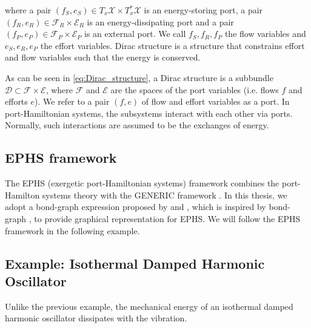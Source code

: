 \documentclass[
	parskip, 			   %
	twoside, 			   %
	DIV=14, 			   %
	BCOR=15.0mm, 		   %
	headsepline, 		   %
	open=right, 		   %
	captions=tableheading, %
	bibliography=totoc,    %
	numbers=noenddot       %
]{scrreprt}
\begin{document}
where a pair $(f_S, e_S) \in T_{x}\mathcal{X} \times T_{x}^{*}\mathcal{X}$ is an energy-storing port, a pair $(f_R, e_R) \in \mathcal{F}_R \times \mathcal{E}_R$ is an energy-dissipating port and a pair $(f_P, e_P) \in \mathcal{F}_P \times \mathcal{E}_P$ is an external port. We call $f_S, f_R, f_P$ the flow variables and $e_S, e_R, e_P$ the effort variables. Dirac structure is a structure that constrains effort and flow variables such that the energy is conserved.

As can be seen in \ref{eq:Dirac_structure}, a Dirac structure is a subbundle $\mathcal{D} \subset \mathcal{F} \times \mathcal{E}$, where $\mathcal{F}$ and $\mathcal{E}$ are the spaces of the port variables (i.e. flows $f$ and efforts $e$). We refer to a pair $(f,e)$ of flow and effort variables as a port. In port-Hamiltonian systems, the subsystems interact with each other via ports. Normally, such interactions are assumed to be the exchanges of energy.

\subsection{EPHS framework}
The EPHS (exergetic port-Hamiltonian systems) framework combines the port-Hamilton systems theory with the GENERIC framework \cite{lohmayer2021exergetic}. In this thesis, we adopt a bond-graph expression proposed by \cite{lohmayer2022ephs} and \cite{lohmayer2022exergetic}, which is inspired by bond-graph \cite{paynter1961analysis}, to provide graphical representation for EPHS. We will follow the EPHS framework in the following example.

\subsection{Example: Isothermal Damped Harmonic Oscillator}
Unlike the previous example, the mechanical energy of an isothermal damped harmonic oscillator dissipates with the vibration.
\end{document}
